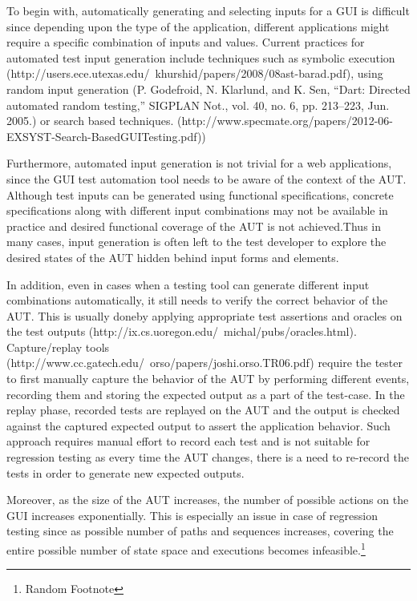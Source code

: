To begin with, automatically generating and selecting inputs for a GUI is difficult since depending upon the type of the application, different applications might require a specific combination of inputs and values. 
Current practices for automated test input generation include techniques such as symbolic execution (http://users.ece.utexas.edu/~khurshid/papers/2008/08ast-barad.pdf), using random input generation (P. Godefroid, N. Klarlund, and K. Sen, “Dart: Directed automated random testing,” SIGPLAN Not., vol. 40, no. 6, pp. 213–223, Jun. 2005.) or search based techniques. (http://www.specmate.org/papers/2012-06-EXSYST-Search-BasedGUITesting.pdf))

Furthermore, automated input generation is not trivial for a web applications, since the GUI test automation tool needs to be aware of the context of the AUT. Although test inputs can be generated using functional specifications, concrete specifications along with different input combinations may not be available in practice and desired functional coverage of the AUT is not achieved.Thus in many cases, input generation is often left to the test developer to explore the desired states of the AUT hidden behind input forms and elements.

In addition, even in cases when a testing tool can generate different input combinations automatically, it still needs to verify the correct behavior of the AUT. This is usually doneby applying appropriate test assertions and oracles on the test outputs (http://ix.cs.uoregon.edu/~michal/pubs/oracles.html). Capture/replay tools (http://www.cc.gatech.edu/~orso/papers/joshi.orso.TR06.pdf) require the tester to first manually capture the behavior of the AUT by performing different events, recording them and storing the expected output as a part of the test-case. In the replay phase, recorded tests are replayed on the AUT and the output is checked against the captured expected output to assert the application behavior. Such approach requires manual effort to record each test and is not suitable for regression testing as every time the AUT changes, there is a need to re-record the tests in order to generate new expected outputs. 

Moreover, as the size of the AUT increases, the number of possible actions on the GUI increases exponentially. This is especially an issue in case of regression testing since as possible number of paths and sequences increases, covering the entire possible number of state space and executions becomes infeasible.\footnote{Random Footnote} 

